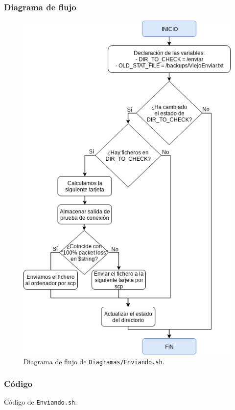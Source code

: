 \subsubsection{Diagrama de flujo}
\begin{figure}[h]
	\centering
	\includegraphics[scale=0.65]{Anexos/Anexo3/Diagramas/Enviando.png}
	\caption{Diagrama de flujo de \texttt{Diagramas/Enviando.sh}.}
	\label{Diagrama de flujo de Enviando.sh}
\end{figure}

\newpage
\subsubsection{Código}

\begin{center}
	Código de \texttt{Enviando.sh}.
\end{center}


